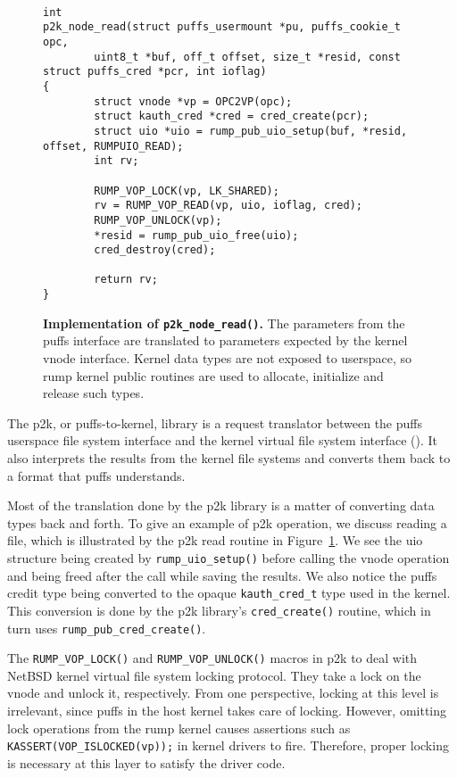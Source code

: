 \begin{figure}[t]
{\tt \scriptsize
\begin{verbatim}
int
p2k_node_read(struct puffs_usermount *pu, puffs_cookie_t opc,
        uint8_t *buf, off_t offset, size_t *resid, const struct puffs_cred *pcr, int ioflag)
{
        struct vnode *vp = OPC2VP(opc);
        struct kauth_cred *cred = cred_create(pcr);
        struct uio *uio = rump_pub_uio_setup(buf, *resid, offset, RUMPUIO_READ);
        int rv;

        RUMP_VOP_LOCK(vp, LK_SHARED);
        rv = RUMP_VOP_READ(vp, uio, ioflag, cred);
        RUMP_VOP_UNLOCK(vp);
        *resid = rump_pub_uio_free(uio);
        cred_destroy(cred);

        return rv;
}
\end{verbatim}}
\caption[Implementation of \texttt{p2k\_node\_read()}]{
\textbf{Implementation of \texttt{p2k\_node\_read()}.}
The parameters from the puffs interface are translated to parameters
expected by the kernel vnode interface.  Kernel data types are not exposed
to userspace, so rump kernel public routines are used to allocate,
initialize and release such types.
}
\label{fig:p2kread}
\end{figure}

The p2k, or puffs-to-kernel, library is a request translator between
the puffs userspace file system interface and the kernel virtual
file system interface ().  It also interprets
the results from the kernel file systems and converts them back to
a format that puffs understands.

Most of the translation done by the p2k library is a matter of
converting data types back and forth.  To give an example of p2k
operation, we discuss reading a file, which is illustrated by the
p2k read routine in Figure~\ref{fig:p2kread}.  We see the uio
structure being created by \verb+rump_uio_setup()+ before calling
the vnode operation and being freed after the call while saving the
results.  We also notice the puffs credit type being converted to
the opaque \verb+kauth_cred_t+ type used in the kernel.  This conversion
is done by the p2k library's \verb+cred_create()+ routine, which
in turn uses \verb+rump_pub_cred_create()+.

The \verb+RUMP_VOP_LOCK()+ and \verb+RUMP_VOP_UNLOCK()+ macros in
p2k to deal with NetBSD kernel virtual file system locking protocol.
They take a lock on the vnode and unlock it,
respectively.  From one perspective, locking at this level is
irrelevant, since puffs in the host kernel takes care of locking.
However, omitting lock operations from the rump kernel causes assertions
such as \verb+KASSERT(VOP_ISLOCKED(vp));+ in kernel drivers to fire.
Therefore, proper locking is necessary at this layer to satisfy the
driver code.

